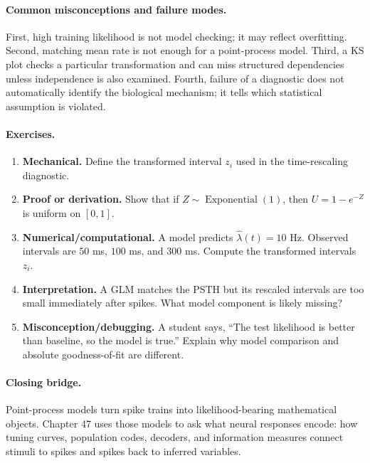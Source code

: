 \paragraph{Common misconceptions and failure modes.}
First, high training likelihood is not model checking; it may reflect overfitting. Second, matching mean rate is not enough for a point-process model. Third, a KS plot checks a particular transformation and can miss structured dependencies unless independence is also examined. Fourth, failure of a diagnostic does not automatically identify the biological mechanism; it tells which statistical assumption is violated.

\paragraph{Exercises.}
\begin{enumerate}[label=\textbf{46.4.\arabic*.}, leftmargin=*]
\item \textbf{Mechanical.} Define the transformed interval \(z_i\) used in the time-rescaling diagnostic.
\item \textbf{Proof or derivation.} Show that if \(Z\sim\operatorname{Exponential}(1)\), then \(U=1-e^{-Z}\) is uniform on \([0,1]\).
\item \textbf{Numerical/computational.} A model predicts \(\hat\lambda(t)=10\) Hz. Observed intervals are \(50\) ms, \(100\) ms, and \(300\) ms. Compute the transformed intervals \(z_i\).
\item \textbf{Interpretation.} A GLM matches the PSTH but its rescaled intervals are too small immediately after spikes. What model component is likely missing?
\item \textbf{Misconception/debugging.} A student says, ``The test likelihood is better than baseline, so the model is true.'' Explain why model comparison and absolute goodness-of-fit are different.
\end{enumerate}

\paragraph{Closing bridge.}
Point-process models turn spike trains into likelihood-bearing mathematical objects. Chapter 47 uses those models to ask what neural responses encode: how tuning curves, population codes, decoders, and information measures connect stimuli to spikes and spikes back to inferred variables.

\clearpage
